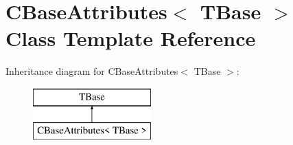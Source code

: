 \hypertarget{class_c_base_attributes}{}\section{C\+Base\+Attributes$<$ T\+Base $>$ Class Template Reference}
\label{class_c_base_attributes}
Inheritance diagram for C\+Base\+Attributes$<$ T\+Base $>$\+:\begin{figure}[H]
\begin{center}
\leavevmode
\includegraphics[height=2.000000cm]{d6/d47/class_c_base_attributes}
\end{center}
\end{figure}
